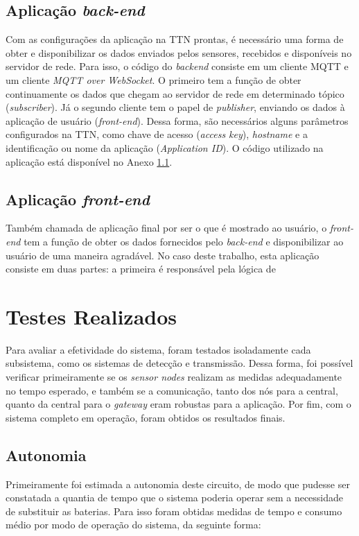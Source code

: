 \documentclass[oneside,openright,12pt]{ufsm_2015} %
\begin{document}
    \subsection{Aplicação \textit{back-end}}
    Com as configurações da aplicação na TTN prontas, é necessário uma forma de obter e disponibilizar os dados enviados pelos sensores, recebidos e disponíveis no servidor de rede. Para isso, o código do \textit{backend} consiste em um cliente MQTT e um cliente \textit{MQTT over WebSocket}. O primeiro tem a função de obter continuamente os dados que chegam ao servidor de rede em determinado tópico (\textit{subscriber}). Já o segundo cliente tem o papel de \textit{publisher}, enviando os dados à aplicação de usuário (\textit{front-end}). Dessa forma, são necessários alguns parâmetros configurados na TTN, como chave de acesso (\textit{access key}), \textit{hostname} e a identificação ou nome da aplicação (\textit{Application ID}). O código utilizado na aplicação está disponível no Anexo \ref{}. 
    
    \subsection{Aplicação \textit{front-end}}
    Também chamada de aplicação final por ser o que é mostrado ao usuário, o \textit{front-end} tem a função de obter os dados fornecidos pelo \textit{back-end} e disponibilizar ao usuário de uma maneira agradável. No caso deste trabalho, esta aplicação consiste em duas partes: a primeira é responsável pela lógica de
    
    \section{Testes Realizados}
    Para avaliar a efetividade do sistema, foram testados isoladamente cada subsistema, como os sistemas de detecção e transmissão. Dessa forma, foi possível verificar primeiramente se os \textit{sensor nodes} realizam as medidas adequadamente no tempo esperado, e também se a comunicação, tanto dos nós para a central, quanto da central para o \textit{gateway} eram robustas para a aplicação. Por fim, com o sistema completo em operação, foram obtidos os resultados finais.
    
    \subsection{Autonomia}
    Primeiramente foi estimada a autonomia deste circuito, de modo que pudesse ser constatada a quantia de tempo que o sistema poderia operar sem a necessidade de substituir as baterias. Para isso foram obtidas medidas de tempo e consumo médio por modo de operação do sistema, da seguinte forma:
    
\end{document}
